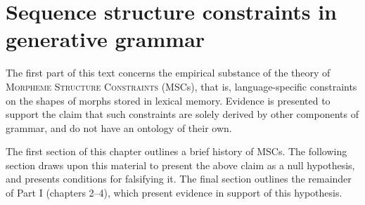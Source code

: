 \chapter{Sequence structure constraints in generative grammar}
\label{msc}

The first part of this text concerns the empirical substance of the theory of \textsc{Morpheme Structure Constraints} (MSCs), that is, language-specific constraints on the shapes of morphs stored in lexical memory.
Evidence is presented to support the claim that such constraints are solely derived by other components of grammar, and do not have an ontology of their own.

The first section of this chapter outlines a brief history of MSCs.
The following section draws upon this material to present the above claim as a null hypothesis, and presents conditions for falsifying it.
The final section outlines the remainder of Part I (chapters 2--4), which present evidence in support of this hypothesis.





